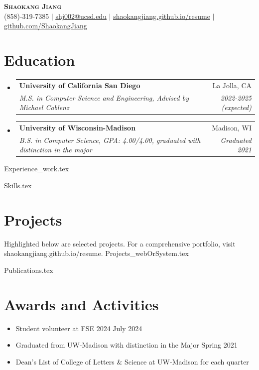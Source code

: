 \documentclass[letterpaper,11pt]{article}
\makeatletter
\newcommand{\resumeItem}[1]{
  \item\small{
    {#1 \vspace{-2pt}}
  }
}
\newcommand{\resumeSubheading}[4]{
  \vspace{-2pt}\item
    \begin{tabular*}{0.97\textwidth}[t]{l@{\extracolsep{\fill}}r}
      \textbf{#1} & #2 \\
      \textit{\small#3} & \textit{\small #4} \\
    \end{tabular*}\vspace{-7pt}
}
\newcommand{\resumeSubHeadingListStart}{\begin{itemize}[leftmargin=0.12in, label={}]}
\newcommand{\resumeSubHeadingListEnd}{\end{itemize}}
\newcommand{\resumeItemListStart}{\begin{itemize}}
\newcommand{\resumeItemListEnd}{\end{itemize}\vspace{-5pt}}
\makeatother
\begin{document}

\begin{center}
    \textbf{\Huge \scshape Shaokang Jiang} \\ \vspace{1pt}
    \small (858)-319-7385 $|$ \href{mailto:shj002@ucsd.edu}{\underline{shj002@ucsd.edu}} $|$ 
    \href{https://shaokangjiang.github.io/resume}{\underline{shaokangjiang.github.io/resume}} $|$
    \href{https://github.com/ShaokangJiang}{\underline{github.com/ShaokangJiang}}
\end{center}


\section{Education}
  \resumeSubHeadingListStart
    \resumeSubheading
      {University of California San Diego}{La Jolla, CA}
      {M.S. in Computer Science and Engineering, Advised by Michael Coblenz}{2022-2025 (expected)}
    \resumeSubheading
      {University of Wisconsin-Madison}{Madison, WI}
      {B.S. in Computer Science, GPA: 4.00/4.00, graduated with distinction in the major}{Graduated 2021}
  \resumeSubHeadingListEnd


  
{Experience_work.tex}

%
{Skills.tex}


\section{Projects}

Highlighted below are selected projects. For a comprehensive portfolio, visit shaokangjiang.github.io/resume.
\vspace{0.5em}
{Projects_webOrSystem.tex}




% 
{Publications.tex}


\section{Awards and Activities}

\resumeItemListStart
\resumeItem{Student volunteer at FSE 2024 \hfill July 2024}
\resumeItem{Graduated from UW-Madison with distinction in the Major \hfill Spring 2021}
\resumeItem{Dean's List of College of Letters \& Science at UW-Madison for each quarter}
\resumeItemListEnd


\end{document}
